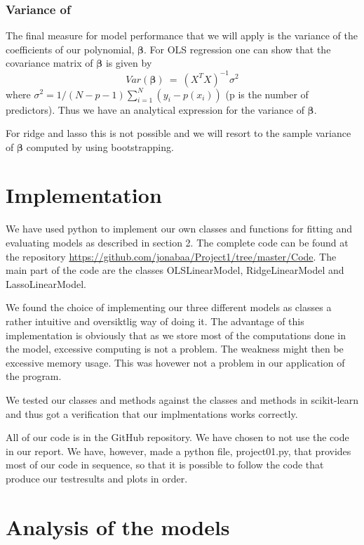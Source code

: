 \documentclass[a4paper,norsk]{article}
\begin{document}
\subsubsection{Variance of \bm{$\beta$}}
The final measure for model performance that we will apply is the variance 
of the coefficients of our polynomial, $\bm{\beta}$. For OLS regression
one can show that the covariance matrix of $\bm{\beta}$ is given by
\begin{equation}
    Var(\bm{\beta}) \ = \ (X^TX)^{-1} \sigma^2
\end{equation}
where $\sigma^2 = 1/(N - p - 1) \sum_{i=1}^N (y_i - p(x_i))$ 
(p is the number of predictors). Thus we have an analytical expression for 
the variance of $\bm{\beta}$.
\par
For ridge and lasso this is not possible and we will resort to the sample 
variance of $\bm{\beta}$ computed by using bootstrapping.

\section{Implementation}
We have used python to implement our own classes and functions for 
fitting and evaluating models as described in section 2.  
The complete code can be found at the repository 
\url{https://github.com/jonabaa/Project1/tree/master/Code}. 
The main part of the code
are the classes OLSLinearModel, RidgeLinearModel and LassoLinearModel. 
\par
We found the choice of implementing our three different models as classes 
a rather intuitive and oversiktlig way of doing it. The advantage of this
implementation is obviously that as we store most of the computations 
done in the model, excessive computing is not
a problem. The weakness might then be excessive memory usage. This was 
hovewer not a problem in our application of the program.
\par
We tested our classes and methods against the classes and methods in 
scikit-learn and thus got a verification that our implmentations 
works correctly.
\par 
All of our code is in the GitHub repository. We have chosen to 
not use the code in our report. We have, however, made a python file, 
project01.py, that provides most of our code in sequence, 
so that it is possible to follow the code that produce our testresults 
and plots in order.

\section{Analysis of the models}
\end{document}
